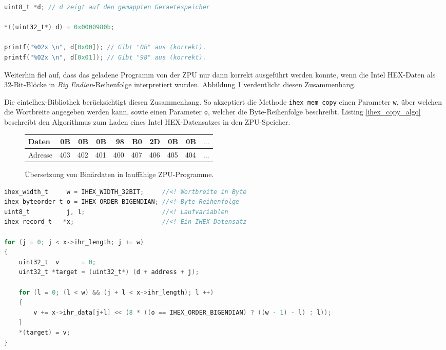 \documentclass[12pt]{scrartcl}
\begin{document}
\begin{lstlisting}[float=p,language=C,caption=Korrektes Verhalten des ZPU-Speichers bei 32-Bit-Zugriff,morekeywords={uint8_t,uint32_t},label=zpu_mem_32bit]
uint8_t *d; // d zeigt auf den gemappten Geraetespeicher

*((uint32_t*) d) = 0x0000980b;

printf("%02x \n", d[0x00]); // Gibt "0b" aus (korrekt).
printf("%02x \n", d[0x01]); // Gibt "98" aus (korrekt).
\end{lstlisting}

Weiterhin fiel auf, dass das geladene Programm von der ZPU nur dann korrekt ausgeführt werden konnte, wenn die Intel HEX-Daten als 32-Bit-Blöcke in \emph{Big Endian}-Reihenfolge interpretiert wurden. Abbildung  \ref{zpu_addresses} verdeutlicht diesen Zusammenhang.

Die cintelhex-Bibliothek berücksichtigt diesen Zusammenhang. So akzeptiert die Methode \texttt{ihex\_mem\_copy} einen Parameter \texttt{w}, über welchen die Wortbreite angegeben werden kann, sowie einen Parameter \texttt{o}, welcher die Byte-Reihenfolge beschreibt. Listing \ref{ihex_copy_algo} beschreibt den Algorithmus zum Laden eines Intel HEX-Datensatzes in den ZPU-Speicher.

\begin{figure}
\begin{center}
\begin{tabular}{lrrrrrrrrc}
	\toprule
	Daten   &  0B &  0B &  0B &  98 &  B0 &  2D &  0B &  0B & $\ldots$ \\ \midrule
	Adresse & 403 & 402 & 401 & 400 & 407 & 406 & 405 & 404 & $\ldots$ \\ \bottomrule
\end{tabular}
\end{center}
\caption{Übersetzung von Binärdaten in lauffähige ZPU-Programme.}
\label{zpu_addresses}
\end{figure}

\begin{lstlisting}[float=p,language=C,caption=Algorithmus zum Laden eines Intel HEX-Datensatzes in den ZPU-Speicher,morekeywords={uint8_t, uint32_t, ihex_width_t, ihex_record_t, ihex_byteorder_t},label=ihex_copy_algo]
ihex_width_t     w = IHEX_WIDTH_32BIT;     //<! Wortbreite in Byte
ihex_byteorder_t o = IHEX_ORDER_BIGENDIAN; //<! Byte-Reihenfolge
uint8_t          j, l;                     //<! Laufvariablen
ihex_record_t   *x;                        //<! Ein IHEX-Datensatz

for (j = 0; j < x->ihr_length; j += w)
{
	uint32_t  v      = 0;
	uint32_t *target = (uint32_t*) (d + address + j);
					
	for (l = 0; (l < w) && (j + l < x->ihr_length); l ++)
	{
		v += x->ihr_data[j+l] << (8 * ((o == IHEX_ORDER_BIGENDIAN) ? ((w - 1) - l) : l));
	}
	*(target) = v;
}
\end{lstlisting}

\pagebreak %

\fancyhead[R]{}

\thispagestyle{empty}

\renewcommand*{\biburlprefix}{(URL: }
\renewcommand*{\biburlsuffix}{)}

\pagebreak
{} %


\appendix
\end{document}
